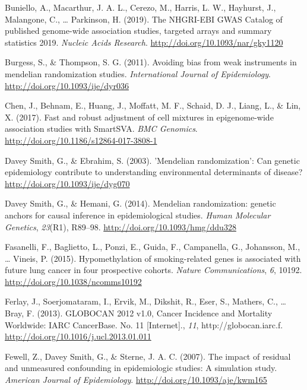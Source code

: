 \documentclass[11pt,twoside]{bristolthesis}
\newlength{\cslhangindent}
\newenvironment{cslreferences}%
  {\setlength{\parindent}{0pt}%
  \everypar{\setlength{\hangindent}{\cslhangindent}}\ignorespaces}%
  {\par}
\begin{document}
\begin{cslreferences}
\leavevmode\hypertarget{ref-Buniello2019}{}%
Buniello, A., Macarthur, J. A. L., Cerezo, M., Harris, L. W., Hayhurst, J., Malangone, C., \ldots{} Parkinson, H. (2019). The NHGRI-EBI GWAS Catalog of published genome-wide association studies, targeted arrays and summary statistics 2019. \emph{Nucleic Acids Research}. \url{http://doi.org/10.1093/nar/gky1120}

\leavevmode\hypertarget{ref-Burgess2011}{}%
Burgess, S., \& Thompson, S. G. (2011). Avoiding bias from weak instruments in mendelian randomization studies. \emph{International Journal of Epidemiology}. \url{http://doi.org/10.1093/ije/dyr036}

\leavevmode\hypertarget{ref-Chen2017}{}%
Chen, J., Behnam, E., Huang, J., Moffatt, M. F., Schaid, D. J., Liang, L., \& Lin, X. (2017). Fast and robust adjustment of cell mixtures in epigenome-wide association studies with SmartSVA. \emph{BMC Genomics}. \url{http://doi.org/10.1186/s12864-017-3808-1}

\leavevmode\hypertarget{ref-DaveySmith2003}{}%
Davey Smith, G., \& Ebrahim, S. (2003). 'Mendelian randomization': Can genetic epidemiology contribute to understanding environmental determinants of disease? \url{http://doi.org/10.1093/ije/dyg070}

\leavevmode\hypertarget{ref-DaveySmith2014}{}%
Davey Smith, G., \& Hemani, G. (2014). Mendelian randomization: genetic anchors for causal inference in epidemiological studies. \emph{Human Molecular Genetics}, \emph{23}(R1), R89--98. \url{http://doi.org/10.1093/hmg/ddu328}

\leavevmode\hypertarget{ref-Fasanelli2015}{}%
Fasanelli, F., Baglietto, L., Ponzi, E., Guida, F., Campanella, G., Johansson, M., \ldots{} Vineis, P. (2015). Hypomethylation of smoking-related genes is associated with future lung cancer in four prospective cohorts. \emph{Nature Communications}, \emph{6}, 10192. \url{http://doi.org/10.1038/ncomms10192}

\leavevmode\hypertarget{ref-Ferlay2013}{}%
Ferlay, J., Soerjomataram, I., Ervik, M., Dikshit, R., Eser, S., Mathers, C., \ldots{} Bray, F. (2013). GLOBOCAN 2012 v1.0, Cancer Incidence and Mortality Worldwide: IARC CancerBase. No. 11 {[}Internet{]}., \emph{11}, http://globocan.iarc.f. \url{http://doi.org/10.1016/j.ucl.2013.01.011}

\leavevmode\hypertarget{ref-Fewell2007}{}%
Fewell, Z., Davey Smith, G., \& Sterne, J. A. C. (2007). The impact of residual and unmeasured confounding in epidemiologic studies: A simulation study. \emph{American Journal of Epidemiology}. \url{http://doi.org/10.1093/aje/kwm165}


\end{cslreferences}
\end{document}
